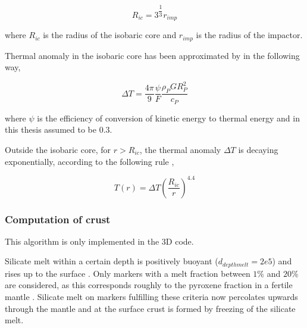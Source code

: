 \begin{equation}
R_{ic} = 3^{\dfrac{1}{3}} r_{imp}
\end{equation}

where $R_{ic}$ is the radius of the isobaric core and $r_{imp}$ is the radius of the impactor.

Thermal anomaly in the isobaric core has been approximated by \citet{Monteux2007} in the following way,

\begin{equation}
\Delta T = \dfrac{4 \pi}{9} \dfrac{\psi}{F} \dfrac{\rho_P G R_P^2}{c_P}
\end{equation}

where $\psi$ is the efficiency of conversion of kinetic energy to thermal energy and in this thesis assumed to be $0.3$.

Outside the isobaric core, for $r > R_{ic}$, the thermal anomaly $\Delta T$ is decaying exponentially, according to the following rule \citep{Senshu2002,Monteux2007},

\begin{equation}
T(r) = \Delta T \left(\dfrac{R_{ic}}{r}\right)^{4.4}
\end{equation}

%
%
%

\subsubsection{Computation of crust}
\label{chp:II_2.1.7}

This algorithm is only implemented in the 3D code.

Silicate melt within a certain depth is positively buoyant ($d_{depthmelt}=2e5$) and rises up to the surface \citep{Golabek2011}. Only markers with a melt fraction between $1\%$ and $20\%$ are considered, as this corresponds roughly to the pyroxene fraction in a fertile mantle \citep{Golabek2011}. Silicate melt on markers fulfilling these criteria now percolates upwards through the mantle and at the surface crust is formed by freezing of the silicate melt. 

